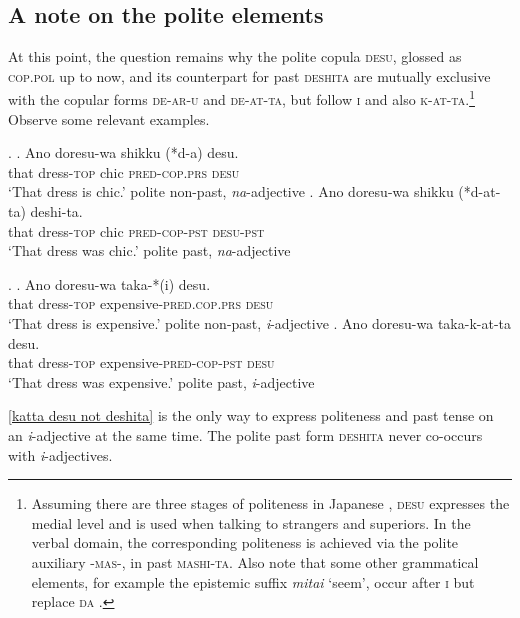 \documentclass [output=book,colorlinks,citecolor=brown]{langscibook}
\begin{document}
\subsection{A note on the polite elements} \label{desu}

At this point, the question remains why the polite copula \textsc{desu}, glossed as \textsc{cop.pol} up to now, and its counterpart for past \textsc{deshita} are mutually exclusive with the copular forms \textsc{de-ar-u} and \textsc{de-at-ta}, but follow \textsc{i} and also \textsc{k-at-ta}.\footnote{Assuming there are three stages of politeness in Japanese \citep{minami.1977:gendai}, \textsc{desu} expresses the medial level and is used when talking to strangers and superiors. In the verbal domain, the corresponding politeness is achieved via the polite auxiliary -\textsc{mas}-, in past \textsc{mashi-ta}. Also note that some other grammatical elements, for example the epistemic suffix \textit{mitai} `seem’, occur after \textsc{i} but replace \textsc{da} \citep{kubo:1992:japanese, urushibara:1993:syntactic, nishiyama:1999:adj}.} Observe some relevant examples. %

\ex. \ag. Ano doresu-wa shikku (*d-a) desu.\\
that dress-\textsc{top} chic \textsc{pred-cop.prs} \textsc{desu}\\
`That dress is chic.' \null \hfill polite non-past, \textit{na}-adjective
 \bg. Ano doresu-wa shikku (*d-at-ta) deshi-ta.\\
that dress-\textsc{top} chic \textsc{pred-cop-pst} \textsc{desu}-\textsc{pst}\\
`That dress was chic.' \null \hfill polite past, \textit{na}-adjective

\newpage

\ex. \ag. Ano doresu-wa taka-*(i) desu.\\
that dress-\textsc{top} expensive-\textsc{pred.cop.prs} \textsc{desu}\\
`That dress is expensive.' \null \hfill polite non-past, \textit{i}-adjective
\bg. Ano doresu-wa taka-k-at-ta desu.\\
that dress-\textsc{top} expensive-\textsc{pred-cop-pst} \textsc{desu}\\
`That dress was expensive.' \null \hfill polite past, \textit{i}-adjective \label{katta desu not deshita}

\ref{katta desu not deshita} is the only way to express politeness and past tense on an \textit{i}-adjective at the same time. The polite past form \textsc{deshita} never co-occurs with \textit{i}-adjectives.
\end{document}
